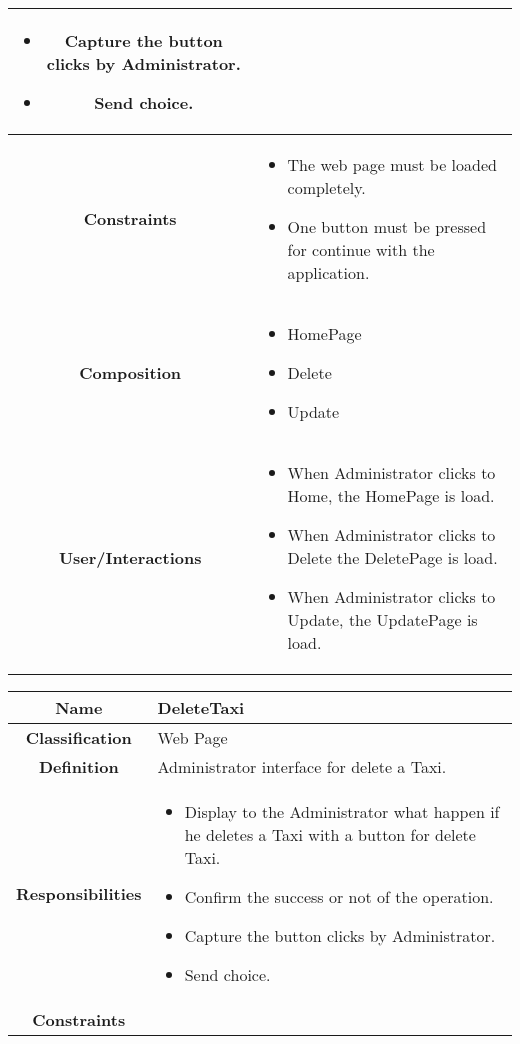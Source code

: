 \documentclass[11pt, a4paper,titlepage]{article}
\begin{document}
\begin{enumerate}
\begin{tabularx}{\textwidth}{| c | X |}
\begin{itemize}
\begin{itemize}
		\end{itemize}
		\item Capture the button clicks by Administrator.
		\item Send choice.
	\end{itemize}
	\\
	\hline
	\textbf{Constraints} &
	\begin{itemize}
		\item  The web page must be loaded completely.
		\item One button must be pressed for continue with the application.
	\end{itemize}
	\\
	\hline
	\textbf{Composition} &
	\begin{itemize}
		\item HomePage
		\item Delete
		\item Update
	\end{itemize}
	\\
	\hline
	\textbf{User/Interactions} &
	\begin{itemize}
		\item When Administrator clicks to Home, the HomePage is load.    	
		\item When Administrator clicks to Delete the DeletePage is load.    	
		\item When Administrator clicks to Update, the UpdatePage is load.
	\end{itemize}
	\\
	\hline 
\end{tabularx}
\begin{tabularx}{\textwidth}{| c | X |}
	\hline
	\textbf{Name} &
	DeleteTaxi
	\\
	\hline
	\textbf{Classification} &
	Web Page
	\\
	\hline
	\textbf{Definition} &
	Administrator interface for delete a Taxi.\\
	\hline
	\textbf{Responsibilities} &
	\begin{itemize}
		\item Display to the Administrator what happen if he deletes a Taxi with a button for delete Taxi.
		\item Confirm the success or not of the operation.
		\item Capture the button clicks by Administrator.
		\item Send choice.
	\end{itemize}
	\\
	\hline
	\textbf{Constraints} &

\end{tabularx}
\end{enumerate}
\end{document}
